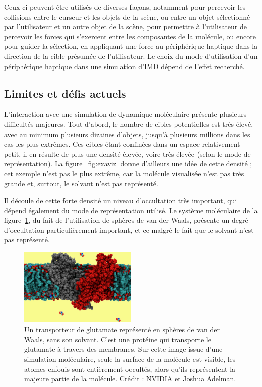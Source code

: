 	Ceux-ci peuvent être utilisés de diverses façons, notamment pour percevoir les \og collisions \fg{} entre le curseur et les objets de la scène, ou entre un objet sélectionné par l'utilisateur et un autre objet de la scène, pour permettre à l'utilisateur de percevoir les forces qui s'exercent entre les composantes de la molécule, ou encore pour guider la sélection, en appliquant une force au périphérique haptique dans la direction de la cible présumée de l'utilisateur. Le choix du mode d'utilisation d'un périphérique haptique dans une simulation d'IMD dépend de l'effet recherché.
	
	\subsection{Limites et défis actuels}
	L'interaction avec une simulation de dynamique moléculaire présente plusieurs difficultés majeures. Tout d'abord, le nombre de cibles potentielles est très élevé, avec au minimum plusieurs dizaines d'objets, jusqu'à plusieurs millions dans les cas les plus extrêmes. Ces cibles étant confinées dans un espace relativement petit, il en résulte de plus une densité élevée, voire très élevée (selon le mode de représentation). La figure~\ref{fig:exaviz} donne d'ailleurs une idée de cette densité ; cet exemple n'est pas le plus extrême, car la molécule visualisée n'est pas très grande et, surtout, le solvant n'est pas représenté.
	
	Il découle de cette forte densité un niveau d'occultation très important, qui dépend également du mode de représentation utilisé. Le système moléculaire de la figure~\ref{fig:gluTrans}, du fait de l'utilisation de sphères de van der Waals, présente un degré d'occultation particulièrement important, et ce malgré le fait que le solvant n'est pas représenté.
	
	\begin{figure}%
		\centering
		\includegraphics[width=0.5\textwidth]{figures/ch1/gluTrans}
		\caption[Transporteur de glutamate, très forte occultation]{Un transporteur de glutamate représenté en sphères de van der Waals, sans son solvant. C'est une protéine qui transporte le glutamate à travers des membranes. Sur cette image issue d'une simulation moléculaire, seule la surface de la molécule est visible, les atomes \og enfouis \fg{} sont entièrement occultés, alors qu'ils représentent la majeure partie de la molécule. Crédit : NVIDIA et Joshua Adelman\footnotemark.}
		\label{fig:gluTrans}
	\end{figure}
	
